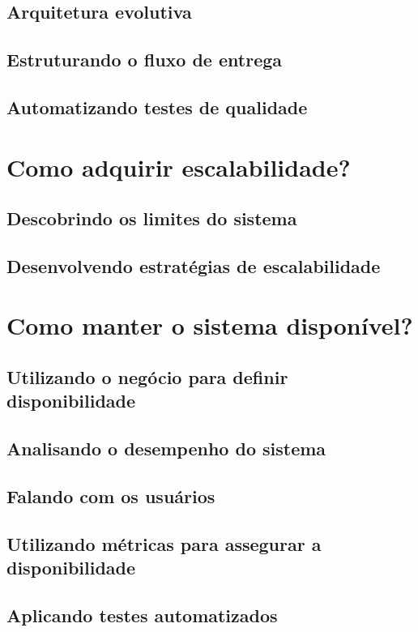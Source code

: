     \subsection{Arquitetura evolutiva}
    \subsection{Estruturando o fluxo de entrega}
    \subsection{Automatizando testes de qualidade}

  \section{Como adquirir escalabilidade?}
    \subsection{Descobrindo os limites do sistema}
    \subsection{Desenvolvendo estratégias de escalabilidade}

  \section{Como manter o sistema disponível?}
    \subsection{Utilizando o negócio para definir disponibilidade}
    \subsection{Analisando o desempenho do sistema}
    \subsection{Falando com os usuários}
    \subsection{Utilizando métricas para assegurar a disponibilidade}
    \subsection{Aplicando testes automatizados}


